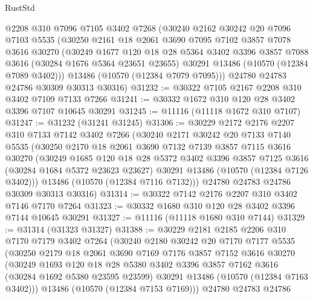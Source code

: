 \begin{lexlean}{RustStd}
\begin{coremodule}
    @2208
    @310
    @7096
    @7105
    @3402
    @7268
    (@30240
      @2162
      @30242
      @20
      @7096
      @7103
      @5535
      (@30250
        @2161
        @18
        @2061
        @3690
        @7095
        @7102
        @3857
        @7078
        @3616
        @30270
        (@30249
          @1677
          @120
          @18
          @28
          @5364
          @3402
          @3396
          @3857
          @7088
          @3616
          (@30284 @1676 @5364 @23651 @23655)
          @30291
          @13486
          (@10570 (@12384 @7089 @3402)))
        @13486
        (@10570 (@12384 @7079 @7095)))
      @24780
      @24783
      @24786
      @30309
      @30313
      @30316)
@31232 := @30322 @7105 @2167 @2208 @310 @3402 @7109 @7133 @7266
@31241 := @30332 @1672 @310 @120 @28 @3402 @3396 @7107 @10645 @30291
@31245 := @11116 (@11118 @1672 @310 @7107)
@31247 := @31232 (@31241 @31245)
@31306 := @30229
    @2172
    @2176
    @2207
    @310
    @7133
    @7142
    @3402
    @7266
    (@30240
      @2171
      @30242
      @20
      @7133
      @7140
      @5535
      (@30250
        @2170
        @18
        @2061
        @3690
        @7132
        @7139
        @3857
        @7115
        @3616
        @30270
        (@30249
          @1685
          @120
          @18
          @28
          @5372
          @3402
          @3396
          @3857
          @7125
          @3616
          (@30284 @1684 @5372 @23623 @23627)
          @30291
          @13486
          (@10570 (@12384 @7126 @3402)))
        @13486
        (@10570 (@12384 @7116 @7132)))
      @24780
      @24783
      @24786
      @30309
      @30313
      @30316)
@31314 := @30322 @7142 @2176 @2207 @310 @3402 @7146 @7170 @7264
@31323 := @30332 @1680 @310 @120 @28 @3402 @3396 @7144 @10645 @30291
@31327 := @11116 (@11118 @1680 @310 @7144)
@31329 := @31314 (@31323 @31327)
@31388 := @30229
    @2181
    @2185
    @2206
    @310
    @7170
    @7179
    @3402
    @7264
    (@30240
      @2180
      @30242
      @20
      @7170
      @7177
      @5535
      (@30250
        @2179
        @18
        @2061
        @3690
        @7169
        @7176
        @3857
        @7152
        @3616
        @30270
        (@30249
          @1693
          @120
          @18
          @28
          @5380
          @3402
          @3396
          @3857
          @7162
          @3616
          (@30284 @1692 @5380 @23595 @23599)
          @30291
          @13486
          (@10570 (@12384 @7163 @3402)))
        @13486
        (@10570 (@12384 @7153 @7169)))
      @24780
      @24783
      @24786

\end{coremodule}
\end{lexlean}
